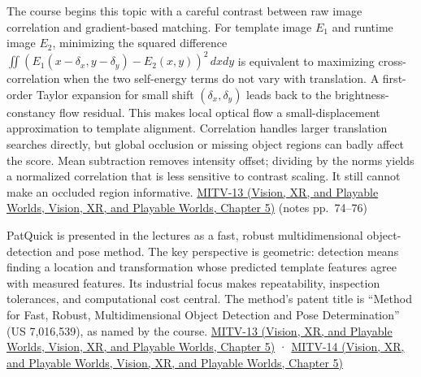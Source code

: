 The course begins this topic with a careful contrast between raw image correlation and gradient-based matching. For template image \(E_1\) and runtime image \(E_2\), minimizing the squared difference \(\iint(E_1(x-\delta_x,y-\delta_y)-E_2(x,y))^2\,dxdy\) is equivalent to maximizing cross-correlation when the two self-energy terms do not vary with translation. A first-order Taylor expansion for small shift \((\delta_x,\delta_y)\) leads back to the brightness-constancy flow residual. This makes local optical flow a small-displacement approximation to template alignment. Correlation handles larger translation searches directly, but global occlusion or missing object regions can badly affect the score. Mean subtraction removes intensity offset; dividing by the norms yields a normalized correlation that is less sensitive to contrast scaling. It still cannot make an occluded region informative. \href{../07-Vision-XR-and-Playable-Worlds/main.pdf\#nameddest=04-visual-computing-ii-ch036-mitv-13---object-detection-recognition-and-pose-determination-patquick-us-7016539}{MITV-13 (Vision, XR, and Playable Worlds, Vision, XR, and Playable Worlds, Chapter 5)} (notes pp.~74--76)

PatQuick is presented in the lectures as a fast, robust multidimensional object-detection and pose method. The key perspective is geometric: detection means finding a location and transformation whose predicted template features agree with measured features. Its industrial focus makes repeatability, inspection tolerances, and computational cost central. The method's patent title is ``Method for Fast, Robust, Multidimensional Object Detection and Pose Determination'' (US 7,016,539), as named by the course. \href{../07-Vision-XR-and-Playable-Worlds/main.pdf\#nameddest=04-visual-computing-ii-ch036-mitv-13---object-detection-recognition-and-pose-determination-patquick-us-7016539}{MITV-13 (Vision, XR, and Playable Worlds, Vision, XR, and Playable Worlds, Chapter 5)} · \href{../07-Vision-XR-and-Playable-Worlds/main.pdf\#nameddest=04-visual-computing-ii-ch036-mitv-14---inspection-in-patquick-hough-transform-homography-position-determination-multi-scale}{MITV-14 (Vision, XR, and Playable Worlds, Vision, XR, and Playable Worlds, Chapter 5)}

